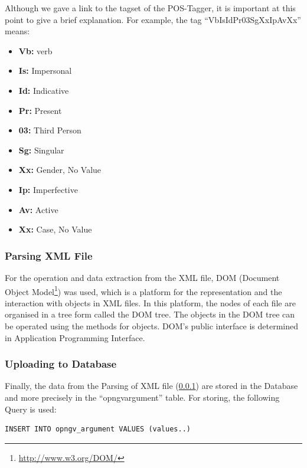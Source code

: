 Although we gave a link to the tagset of the POS-Tagger, it is important at this point to give a brief explanation. For example, the tag ``VbIsIdPr03SgXxIpAvXx'' means:\\

\begin{itemize}

	\item \textbf{Vb:} verb
	\item \textbf{Is:} Impersonal
	\item \textbf{Id:} Indicative
	\item \textbf{Pr:} Present
	\item \textbf{03:} Third Person
	\item \textbf{Sg:} Singular
	\item \textbf{Xx:} Gender, No Value
	\item \textbf{Ip:} Imperfective
	\item \textbf{Av:} Active
	\item \textbf{Xx:} Case, No Value

\end{itemize}

\subsubsection{Parsing XML File}\label{3223_ref}
For the operation and data extraction from the XML file, DOM (Document Object Model\footnote{\url{http://www.w3.org/DOM/}}) was used, which is a platform for the representation and the interaction with objects in XML files. In this platform, the nodes of each file are organised in a tree form called the DOM tree. The objects in the DOM tree can be operated using the methods for objects. DOM's public interface is determined in Application Programming Interface.

\subsubsection{Uploading to Database}\label{3224_ref}
Finally, the data from the Parsing of XML file (\ref{3223_ref}) are stored in the Database and more precisely in the ``opngv\textunderscore argument'' table. For storing, the following Query is used:\\
\lstset{language=SQL}
\begin{lstlisting}[frame=single, basicstyle=\small]
INSERT INTO opngv_argument VALUES (values..)
\end{lstlisting}


